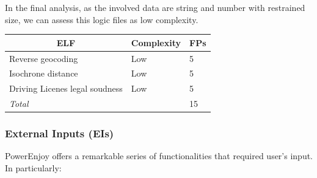 \documentclass[english]{article}
\begin{document}
In the final analysis, as the involved data are string and number with restrained size, we can assess this logic files as low complexity.\\

\begin{center}
	\begin{tabular}{ |p{8cm}|m{2cm}|p{1cm}| }
		\hline
		\multicolumn{1}{|c|}{\textbf{ELF}} & \multicolumn{1}{c|}{\textbf{Complexity}} & \multicolumn{1}{c|}{\textbf{FPs}} \\
		\hline
		Reverse geocoding & Low & 5 \\
		\hline
		Isochrone distance & Low & 5\\
		\hline
		Driving Licenes legal soudness & Low & 5\\
		\hline
		\multicolumn{2}{|l|}{\textit{Total}} & \multicolumn{1}{l|}{15} \\
		\hline
	\end{tabular}
\end{center}

\subsubsection{External Inputs (EIs)}

PowerEnjoy offers a remarkable series of functionalities that required user's input.\\
In particularly:
\end{document}
